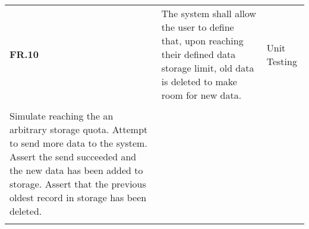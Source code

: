\begin{table}
\begin{tabular}{|l|l|l|}
    	\textbf{FR.10} & The system shall allow the user to define that, upon reaching their defined data storage limit, old data is deleted to make room for new data. & Unit Testing\\\begin{itemize}\\\item Simulate reaching the an arbitrary storage quota. Attempt to send more data to the system. Assert the send succeeded and the new data has been added to storage. Assert that the previous oldest record in storage has been deleted.\\\end{itemize} \\ \hline
	\end{tabular}
\end{table}
